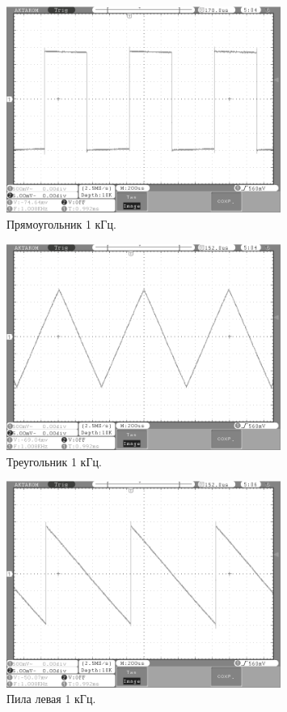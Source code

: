 	\begin{figure}[H]
    \centering
    \includegraphics[width=0.8\textwidth]{../image/square1.bmp}
    \caption{Прямоугольник 1 кГц.}
	\end{figure}	
	
	\begin{figure}[H]
    \centering
    \includegraphics[width=0.8\textwidth]{../image/triangle1.bmp}
    \caption{Треугольник 1 кГц.}
	\end{figure}	

	\begin{figure}[H]
    \centering
    \includegraphics[width=0.8\textwidth]{../image/l_saw1.bmp}
    \caption{Пила левая 1 кГц.}
	\end{figure}	
	
